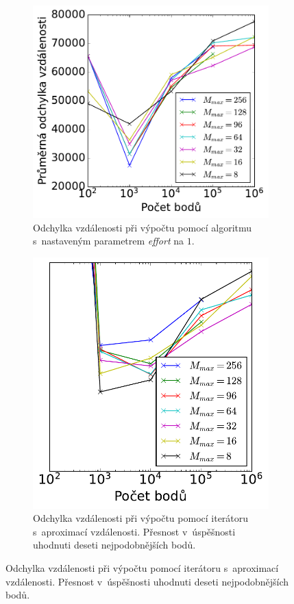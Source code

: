\begin{figure}
\begin{subfigure}[t]{0.49\columnwidth}
\end{subfigure}
\hfill
\begin{subfigure}[t]{0.49\columnwidth}
    \centering  
    \includegraphics[scale=0.6]{obrazky-figures/benchmark/accuracy/normal/acccurucy_leaf1_err_distance.pdf}
    \caption{Odchylka vzdálenosti při výpočtu pomocí  algoritmu  s~nastaveným parametrem \emph{effort} na $1$.}
\end{subfigure}
\hfill
\begin{subfigure}[t]{0.49\columnwidth}
    \includegraphics[scale=0.6]{obrazky-figures/benchmark/accuracy/normal/acccurucy_it_err_distance.pdf}
    \centering  
    \caption{Odchylka vzdálenosti při výpočtu pomocí iterátoru s~aproximací vzdálenosti. Přesnost v~úspěšnosti uhodnuti deseti nejpodobnějších bodů. }


\end{subfigure}
\end{figure}
